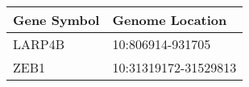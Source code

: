 \begin{tabular}{ll}
\toprule
Gene Symbol &      Genome Location \\
\midrule
     LARP4B &     10:806914-931705 \\
       ZEB1 & 10:31319172-31529813 \\
\bottomrule
\end{tabular}

